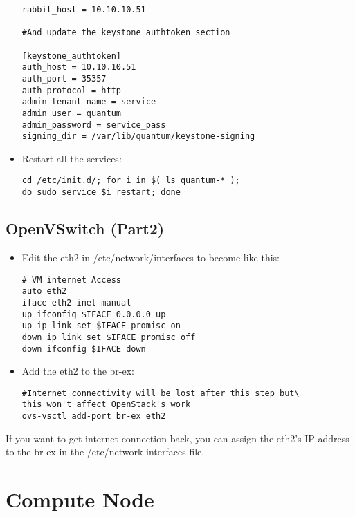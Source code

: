 \begin{itemize}
\begin{verbatim}
rabbit_host = 10.10.10.51

#And update the keystone_authtoken section

[keystone_authtoken]
auth_host = 10.10.10.51
auth_port = 35357
auth_protocol = http
admin_tenant_name = service
admin_user = quantum
admin_password = service_pass
signing_dir = /var/lib/quantum/keystone-signing
\end{verbatim}


\item Restart all the services:

\begin{verbatim}
cd /etc/init.d/; for i in $( ls quantum-* ); 
do sudo service $i restart; done
\end{verbatim}


\end{itemize}

\section{OpenVSwitch (Part2)}
\label{openvswitchpart2}

\begin{itemize}
\item Edit the eth2 in \slash etc\slash network\slash interfaces to become like this:

\begin{verbatim}
# VM internet Access
auto eth2
iface eth2 inet manual
up ifconfig $IFACE 0.0.0.0 up
up ip link set $IFACE promisc on
down ip link set $IFACE promisc off
down ifconfig $IFACE down
\end{verbatim}


\item Add the eth2 to the br-ex:

\begin{verbatim}
#Internet connectivity will be lost after this step but\
this won't affect OpenStack's work
ovs-vsctl add-port br-ex eth2
\end{verbatim}


\end{itemize}

If you want to get internet connection back, you can assign the eth2's IP address to the br-ex in the \slash etc\slash network interfaces file.

\chapter{Compute Node}
\label{computenode}

